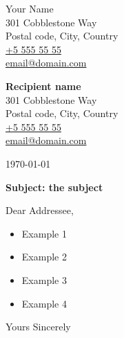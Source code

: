 \documentclass{letter}
\begin{document}
\begin{flushleft}
Your Name\\
301 Cobblestone Way\\
Postal code, City, Country\\
\href{tel:55555555}{+5 555 55 55}\\
\href{mailto:email@domain.com}{email@domain.com}


\vspace*{2\baselineskip}


\textbf{Recipient name}\\
301 Cobblestone Way\\
Postal code, City, Country\\
\href{tel:55555555}{+5 555 55 55}\\
\href{mailto:email@domain.com}{email@domain.com}
\end{flushleft}

\vspace*{4\baselineskip}
\begin{flushright}
\today
\end{flushright}

\begin{flushleft}
\textbf{Subject: the subject}

\vspace*{2\baselineskip}


Dear Addressee,

\lipsum[1-2]
\begin{itemize}
	\item Example 1
	\item Example 2
	\item Example 3
	\item Example 4
\end{itemize}
\lipsum[4]
\vspace*{2\baselineskip}

\closing{Yours Sincerely}

\end{flushleft}
\end{document}
